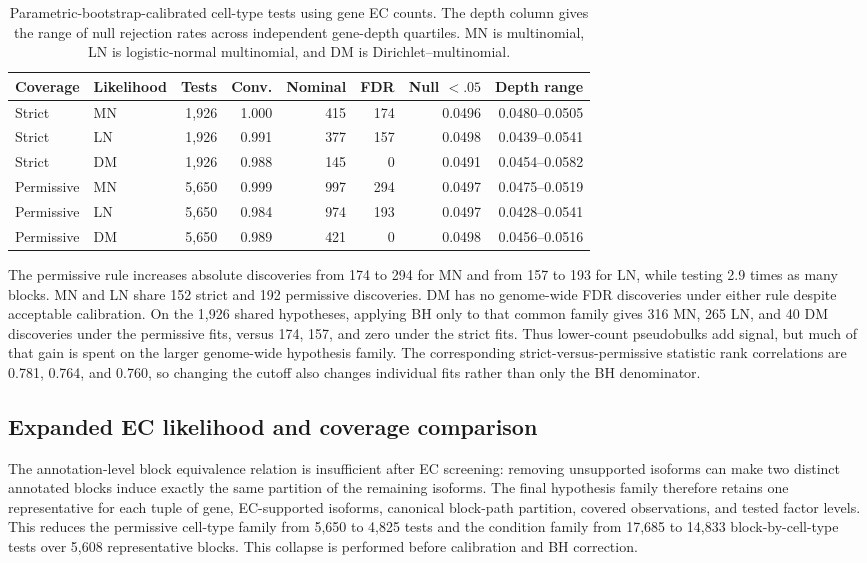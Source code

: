 \documentclass[11pt]{article}
\begin{document}
\begin{table}[H]
\centering
\scriptsize
\caption{Parametric-bootstrap-calibrated cell-type tests using gene EC counts. The depth column gives the range of null rejection rates across independent gene-depth quartiles. MN is multinomial, LN is logistic-normal multinomial, and DM is Dirichlet--multinomial.}
\label{tab:initial-block-results}
\begin{tabular}{llrrrrrr}
\toprule
Coverage & Likelihood & Tests & Conv. & Nominal & FDR & Null $<.05$ & Depth range\\
\midrule
Strict & MN & 1,926 & 1.000 & 415 & 174 & 0.0496 & 0.0480--0.0505\\
Strict & LN & 1,926 & 0.991 & 377 & 157 & 0.0498 & 0.0439--0.0541\\
Strict & DM & 1,926 & 0.988 & 145 & 0 & 0.0491 & 0.0454--0.0582\\
Permissive & MN & 5,650 & 0.999 & 997 & 294 & 0.0497 & 0.0475--0.0519\\
Permissive & LN & 5,650 & 0.984 & 974 & 193 & 0.0497 & 0.0428--0.0541\\
Permissive & DM & 5,650 & 0.989 & 421 & 0 & 0.0498 & 0.0456--0.0516\\
\bottomrule
\end{tabular}
\end{table}

The permissive rule increases absolute discoveries from 174 to 294 for MN and from 157 to 193 for LN, while testing 2.9 times as many blocks. MN and LN share 152 strict and 192 permissive discoveries. DM has no genome-wide FDR discoveries under either rule despite acceptable calibration. On the 1,926 shared hypotheses, applying BH only to that common family gives 316 MN, 265 LN, and 40 DM discoveries under the permissive fits, versus 174, 157, and zero under the strict fits. Thus lower-count pseudobulks add signal, but much of that gain is spent on the larger genome-wide hypothesis family. The corresponding strict-versus-permissive statistic rank correlations are 0.781, 0.764, and 0.760, so changing the cutoff also changes individual fits rather than only the BH denominator.

\subsection*{Expanded EC likelihood and coverage comparison}

The annotation-level block equivalence relation is insufficient after EC screening: removing unsupported isoforms can make two distinct annotated blocks induce exactly the same partition of the remaining isoforms. The final hypothesis family therefore retains one representative for each tuple of gene, EC-supported isoforms, canonical block-path partition, covered observations, and tested factor levels. This reduces the permissive cell-type family from 5,650 to 4,825 tests and the condition family from 17,685 to 14,833 block-by-cell-type tests over 5,608 representative blocks. This collapse is performed before calibration and BH correction.
\end{document}
